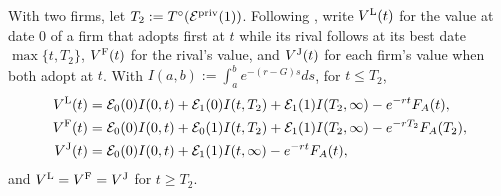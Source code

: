 With two firms, let $T_2:=T^\circ(\mathcal E^{\rm priv}(1))$. Following \citet{fudenberg1985preemption}, write $V^{\rm L}(t)$ for the value at date 0 of a firm that adopts first at $t$ while its rival follows at its best date $\max\{t,T_2\}$, $V^{\rm F}(t)$ for the rival's value, and $V^{\rm J}(t)$ for each firm's value when both adopt at $t$. With $I(a,b):=\int_a^be^{-(r-G)s}ds$, for $t\le T_2$,
\begin{equation}\label{eq:ext-game-values}
\begin{aligned}
V^{\rm L}(t)&=\mathcal E_0(0)I(0,t)+\mathcal E_1(0)I(t,T_2)+\mathcal E_1(1)I(T_2,\infty)-e^{-rt}F_A(t),\\
V^{\rm F}(t)&=\mathcal E_0(0)I(0,t)+\mathcal E_0(1)I(t,T_2)+\mathcal E_1(1)I(T_2,\infty)-e^{-rT_2}F_A(T_2),\\
V^{\rm J}(t)&=\mathcal E_0(0)I(0,t)+\mathcal E_1(1)I(t,\infty)-e^{-rt}F_A(t),
\end{aligned}
\end{equation}
and $V^{\rm L}=V^{\rm F}=V^{\rm J}$ for $t\ge T_2$.


